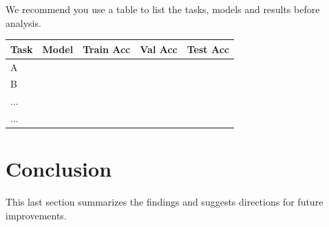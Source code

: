 \documentclass{article}
\begin{document}
    We recommend you use a table to list the tasks, models and results before analysis.
    

    \begin{table}[]
    \label{table:Table1}
    \begin{tabular}{@{}lllll@{}}
    \toprule
    Task & Model & Train Acc & Val Acc & Test Acc \\ \midrule
    A   &       &           &         &          \\
    B   &       &           &         &          \\
    ...   &       &           &         &          \\
    ...   &       &           &         &          \\ \bottomrule
    \end{tabular}
    \end{table}

\section{Conclusion}
\label{sec:conc}
    This last section summarizes the findings and suggests directions for future improvements.

\vfill\pagebreak



\end{document}
